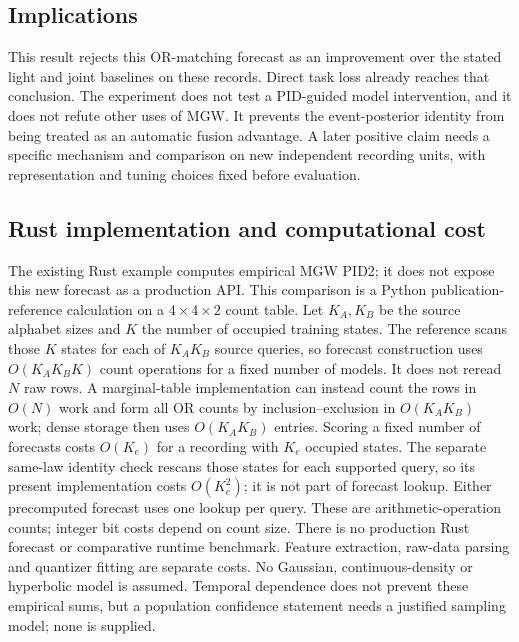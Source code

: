 \subsection{Implications}\label{implications}

This result rejects this OR-matching forecast as an improvement over the stated light and joint baselines on these records. Direct task loss already reaches that conclusion. The experiment does not test a PID-guided model intervention, and it does not refute other uses of MGW. It prevents the event-posterior identity from being treated as an automatic fusion advantage. A later positive claim needs a specific mechanism and comparison on new independent recording units, with representation and tuning choices fixed before evaluation.

\par{}

\subsection{Rust implementation and computational cost}\label{rust-implementation-and-computational-cost}

The existing Rust example computes empirical MGW PID2; it does not expose this new forecast as a production API. This comparison is a Python publication-reference calculation on a \(4\times4\times2\) count table. Let \(K_A,K_B\) be the source alphabet sizes and \(K\) the number of occupied training states. The reference scans those \(K\) states for each of \(K_AK_B\) source queries, so forecast construction uses \(O(K_AK_BK)\) count operations for a fixed number of models. It does not reread \(N\) raw rows. A marginal-table implementation can instead count the rows in \(O(N)\) work and form all OR counts by inclusion--exclusion in \(O(K_AK_B)\) work; dense storage then uses \(O(K_AK_B)\) entries. Scoring a fixed number of forecasts costs \(O(K_e)\) for a recording with \(K_e\) occupied states. The separate same-law identity check rescans those states for each supported query, so its present implementation costs \(O(K_e^2)\); it is not part of forecast lookup. Either precomputed forecast uses one lookup per query. These are arithmetic-operation counts; integer bit costs depend on count size. There is no production Rust forecast or comparative runtime benchmark. Feature extraction, raw-data parsing and quantizer fitting are separate costs. No Gaussian, continuous-density or hyperbolic model is assumed. Temporal dependence does not prevent these empirical sums, but a population confidence statement needs a justified sampling model; none is supplied.

